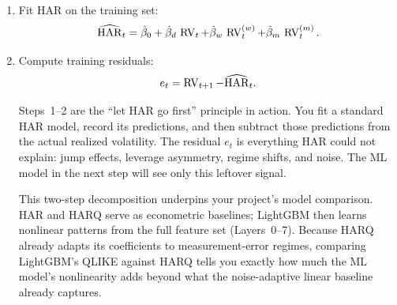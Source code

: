 \begin{enumerate}
  \item Fit HAR on the training set:
        \begin{equation}\label{eq:har-fit-hybrid}
          \widehat{\operatorname{HAR}}_t = \hat{\beta}_0
            + \hat{\beta}_d\,\operatorname{RV}_{t}
            + \hat{\beta}_w\,\operatorname{RV}_{t}^{(w)}
            + \hat{\beta}_m\,\operatorname{RV}_{t}^{(m)}.
        \end{equation}
  \item Compute training residuals:
        \begin{equation}\label{eq:har-resid}
          e_t = \operatorname{RV}_{t+1} - \widehat{\operatorname{HAR}}_t.
        \end{equation}

        \begin{intuition}
        Steps~1--2 are the ``let HAR go first'' principle in action.
        You fit a standard HAR model, record its predictions, and then
        subtract those predictions from the actual realized volatility.
        The residual $e_t$ is everything HAR could not explain: jump
        effects, leverage asymmetry, regime shifts, and noise.  The ML
        model in the next step will see only this leftover signal.
        \end{intuition}

        \begin{projectconnection}
        This two-step decomposition underpins your project's model comparison.
        HAR and HARQ serve as econometric baselines; LightGBM then learns
        nonlinear patterns from the full feature set (Layers~0--7).  Because
        HARQ already adapts its coefficients to measurement-error regimes,
        comparing LightGBM's QLIKE against HARQ tells you exactly how much
        the ML model's nonlinearity adds beyond what the noise-adaptive
        linear baseline already captures.
        \end{projectconnection}


\end{enumerate}
